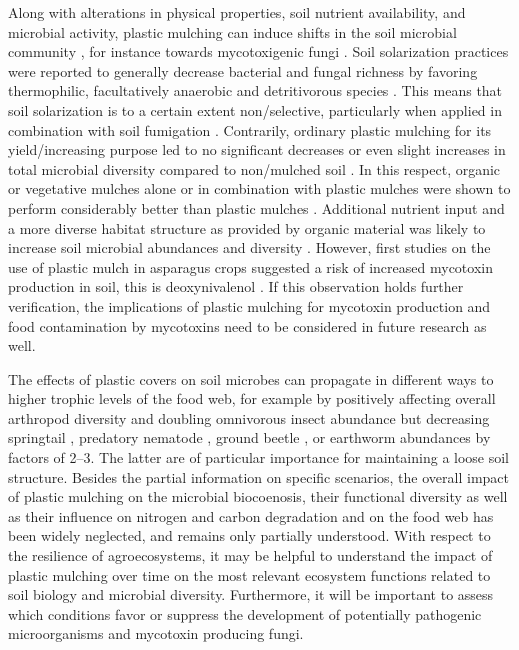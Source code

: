 Along with alterations in physical properties, soil nutrient availability, and microbial activity, plastic mulching can induce shifts in the soil microbial community \citep{HasegawaNitrate2004,MaulMicrobial2014}, for instance towards mycotoxigenic fungi \citep{MunozEffect2015}. Soil solarization practices were reported to generally decrease bacterial and fungal richness by favoring thermophilic, facultatively anaerobic and detritivorous species \citep{BonanomiSoil2008,SimmonsCharacterization2014}. This means that soil solarization is to a certain extent non\-/selective, particularly when applied in combination with soil fumigation \citep[for instance,][]{ChellemiFumigant2013}. Contrarily, ordinary plastic mulching for its yield\-/increasing purpose led to no significant decreases \citep{KapanenPerformance2008} or even slight increases in total microbial diversity compared to non\-/mulched soil \citep{ChenMulching2014, LiuRapid2011}. In this respect, organic or vegetative mulches alone or in combination with plastic mulches were shown to perform considerably better than plastic mulches \citep{CarreraEffects2007,MaulMicrobial2014}. Additional nutrient input and a more diverse habitat structure as provided by organic material was likely to increase soil microbial abundances and diversity \citep{DoganEffect2013,MunozEffect2015,SchonbeckEffects1998a}. However, first studies on the use of plastic mulch in asparagus crops suggested a risk of increased mycotoxin production in soil, this is deoxynivalenol \citep{MunozEffect2015}. If this observation holds further verification, the implications of plastic mulching for mycotoxin production and food contamination by mycotoxins need to be considered in future research as well.

The effects of plastic covers on soil microbes can propagate in different ways to higher trophic levels of the food web, for example by positively affecting overall arthropod diversity and doubling omnivorous insect abundance but decreasing springtail \citep{AddisonInitial2013}, predatory nematode \citep{ForgeEffects2003}, ground beetle \citep{MinarroEffects2003}, or earthworm abundances \citep{SchonbeckEffects1998a} by factors of \numrange[range-phrase = { to }]{2}{3}. The latter are of particular importance for maintaining a loose soil structure. Besides the partial information on specific scenarios, the overall impact of plastic mulching on the microbial biocoenosis, their functional diversity as well as their influence on nitrogen and carbon degradation and on the food web has been widely neglected, and remains only partially understood. With respect to the resilience of agroecosystems, it may be helpful to understand the impact of plastic mulching over time on the most relevant ecosystem functions related to soil biology and microbial diversity. Furthermore, it will be important to assess which conditions favor or suppress the development of potentially pathogenic microorganisms and mycotoxin producing fungi.

